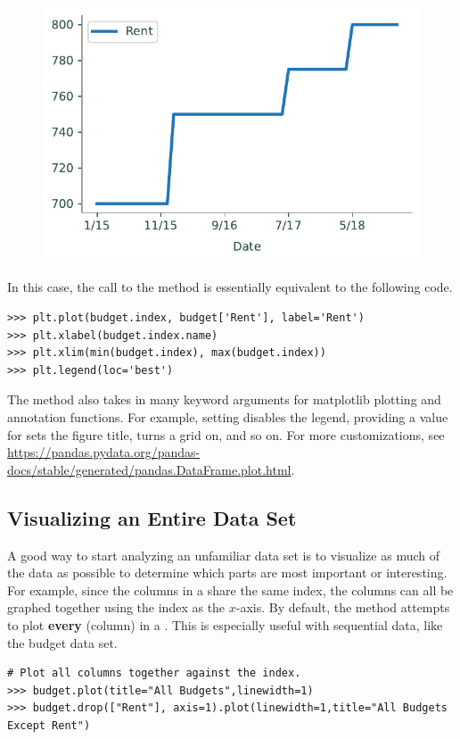 \begin{figure}[H]
\centering
\includegraphics[width=.7\textwidth]{figures/Rent.pdf}
\end{figure}

In this case, the call to the  method is essentially equivalent to the following code.

\begin{lstlisting}
>>> plt.plot(budget.index, budget['Rent'], label='Rent')
>>> plt.xlabel(budget.index.name)
>>> plt.xlim(min(budget.index), max(budget.index))
>>> plt.legend(loc='best')
\end{lstlisting}

The  method also takes in many keyword arguments for matplotlib plotting and annotation functions.
For example, setting  disables the legend, providing a value for  sets the figure title,  turns a grid on, and so on.
For more customizations, see \url{https://pandas.pydata.org/pandas-docs/stable/generated/pandas.DataFrame.plot.html}.

\subsection*{Visualizing an Entire Data Set} %

A good way to start analyzing an unfamiliar data set is to visualize as much of the data as possible to determine which parts are most important or interesting.
For example, since the columns in a  share the same index, the columns can all be graphed together using the index as the $x$-axis.
By default, the  method attempts to plot \textbf{every}  (column) in a .
This is especially useful with sequential data, like the budget data set.

\begin{lstlisting}
# Plot all columns together against the index.
>>> budget.plot(title="All Budgets",linewidth=1)
>>> budget.drop(["Rent"], axis=1).plot(linewidth=1,title="All Budgets Except Rent")
\end{lstlisting}

